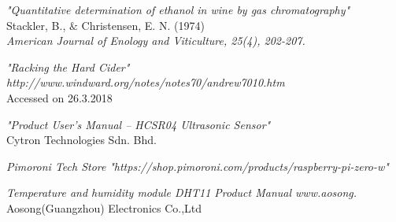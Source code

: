\documentclass[twoside]{ctuthesis}
\theoremstyle{plain}
\theoremstyle{definition}
\theoremstyle{note}
\begin{document}
\begin{thebibliography}{9}
	\textit{"Quantitative determination of ethanol in wine by gas chromatography"}\\
	Stackler, B., $\&$ Christensen, E. N. (1974)\\
	\textit{American Journal of Enology and Viticulture, 25(4), 202-207.}
	
	\textit{"Racking the Hard Cider"}\\
	\textit{http://www.windward.org/notes/notes70/andrew7010.htm}\\
	Accessed on 26.3.2018

	\textit{"Product User’s Manual – HCSR04 Ultrasonic Sensor"}\\
	Cytron Technologies Sdn. Bhd.
	
	\textit{Pimoroni Tech Store}
	\textit{"https://shop.pimoroni.com/products/raspberry-pi-zero-w"}
	
	\textit{Temperature and humidity module DHT11 Product Manual
		www.aosong.}\\
	Aosong(Guangzhou) Electronics Co.,Ltd
	
\end{thebibliography}

\end{document}
